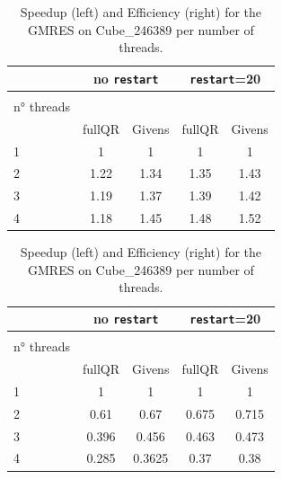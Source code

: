 \documentclass[hidelinks]{article}
\begin{document}
\begin{table}[H]
    \begin{tabular}{ l  c c c c }
        \toprule
        & \multicolumn{2}{c}{no \texttt{restart}} & \multicolumn{2}{c}{\texttt{restart}=20} \\ \midrule
        \begin{minipage}[t][.75cm][t]{1.75cm}
        \raggedleft method \\
        \raggedright n° threads \\
        \end{minipage} & fullQR & Givens 		& fullQR & Givens		\\ \midrule
        1  & 1    & 1    & 1    & 1   \\ 
        2  & 1.22 & 1.34 & 1.35 & 1.43   \\
        3  & 1.19 & 1.37 & 1.39 & 1.42  \\
        4  & 1.18 & 1.45 & 1.48 & 1.52   \\ \bottomrule

    \end{tabular}
    \hfill 
    \begin{tabular}{ l  c c c c }
        \toprule
        & \multicolumn{2}{c}{no \texttt{restart}} & \multicolumn{2}{c}{\texttt{restart}=20} \\ \midrule
        \begin{minipage}[t][.75cm][t]{1.75cm}
        \raggedleft method \\
        \raggedright n° threads \\
        \end{minipage} & fullQR & Givens 		& fullQR & Givens		\\ \midrule
        1  & 1 & 1 & 1 & 1   \\ 
        2  & 0.61 & 0.67 & 0.675 & 0.715  \\
        3  & 0.396 & 0.456 & 0.463 & 0.473  \\
        4  & 0.285 & 0.3625 & 0.37 & 0.38  \\ \bottomrule

    \end{tabular}

    \caption{Speedup (left) and Efficiency (right) for the GMRES on Cube\_246389 per number of threads.}\label{tab:gmresspeedups}
\end{table}
\end{document}
